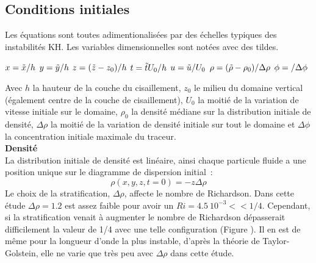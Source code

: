 \documentclass[a4paper,12pt]{article}
\begin{document}
    \subsection{Conditions initiales}
    
    Les équations sont toutes adimentionalisées par des échelles typiques des instabilités KH. Les variables dimensionnelles sont notées avec des tildes. 
    \begin{center}
       $x=\Tilde{x}/h$  \hspace{1cm}  $y=\Tilde{y}/h$  \hspace{1cm}   $z=(\Tilde{z}-z_0)/h$   \hspace{1cm}    $t=\Tilde{t}U_0/h$    \hspace{1cm}  $u=\Tilde{u}/U_{0}$    \hspace{1cm}   $\rho =( \Tilde{\rho}-\rho_0)/\Delta\rho$   \hspace{1cm}     $\phi=\title{\phi}/\Delta\phi$ \\ 
    \end{center}
    Avec $h$ la hauteur de la couche du cisaillement, $z_0$ le milieu du domaine vertical (également centre de la couche de cisaillement), $U_0$ la moitié de la variation de vitesse initiale sur le domaine, $\rho_0$ la densité médiane sur la distribution initiale de densité, $\Delta\rho$ la moitié de la variation de densité initiale sur tout le domaine et $\Delta\phi$ la concentration initiale maximale du traceur. \\
    \newline    
    \textbf{Densité} \\
    La distribution initiale de densité est linéaire, ainsi chaque particule fluide a une position unique sur le diagramme de dispersion initial :
    \begin{equation}
    \label{rho_ini}
        \rho(x,y,z,t=0)=-z\Delta\rho
    \end{equation}
    Le choix de la stratification, $\Delta\rho$, affecte le nombre de Richardson. Dans cette étude $\Delta\rho=1.2$ est assez faible pour avoir un $Ri=4.5\ 10^{-3}<< 1/4$. Cependant, si la stratification venait à augmenter le nombre de Richardson dépasserait difficilement la valeur de 1/4 avec une telle configuration (Figure ). Il en est de même pour la longueur d'onde la plus instable,  d'après la théorie de Taylor-Golstein, elle ne varie que très peu avec $\Delta\rho$ dans cette étude. \\
\end{document}
